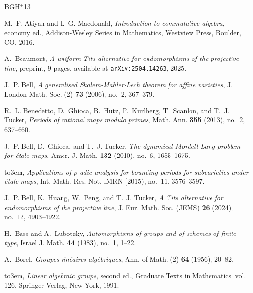 \documentclass{amsart}
\theoremstyle{definition}
\begin{document}
  \newcommand{\etalchar}[1]{$^{#1}$}
\providecommand{\bysame}{\leavevmode\hbox to3em{\hrulefill}\thinspace}
\providecommand{\MR}{\relax\ifhmode\unskip\space\fi MR }
\providecommand{\MRhref}[2]{%
  \href{http://www.ams.org/mathscinet-getitem?mr=#1}{#2}
}
\providecommand{\href}[2]{#2}
\begin{thebibliography}{BGH{\etalchar{+}}13}

M.~F. Atiyah and I.~G. Macdonald, \emph{Introduction to commutative algebra},
  economy ed., Addison-Wesley Series in Mathematics, Westview Press, Boulder,
  CO, 2016.

A.~Beaumont, \emph{A uniform {T}its alternative for endomorphisms of the
  projective line}, preprint, 9 pages, available at {\tt arXiv:2504.14263},
  2025.

J.~P. Bell, \emph{A generalised {S}kolem-{M}ahler-{L}ech theorem for affine
  varieties}, J. London Math. Soc. (2) \textbf{73} (2006), no.~2, 367--379.

\bibitem[BGH{\etalchar{+}}13]{Scanlon}
R.~L. Benedetto, D.~Ghioca, B.~Hutz, P.~Kurlberg, T.~Scanlon, and T.~J. Tucker,
  \emph{Periods of rational maps modulo primes}, Math. Ann. \textbf{355}
  (2013), no.~2, 637--660.

J.~P. Bell, D.~Ghioca, and T.~J. Tucker, \emph{The dynamical {M}ordell-{L}ang
  problem for \'{e}tale maps}, Amer. J. Math. \textbf{132} (2010), no.~6,
  1655--1675.

\bysame, \emph{Applications of {$p$}-adic analysis for bounding periods for
  subvarieties under \'{e}tale maps}, Int. Math. Res. Not. IMRN (2015), no.~11,
  3576--3597.

J.~P. Bell, K.~Huang, W.~Peng, and T.~J. Tucker, \emph{A {T}its alternative for
  endomorphisms of the projective line}, J. Eur. Math. Soc. (JEMS) \textbf{26}
  (2024), no.~12, 4903--4922.

H.~Bass and A.~Lubotzky, \emph{Automorphisms of groups and of schemes of finite
  type}, Israel J. Math. \textbf{44} (1983), no.~1, 1--22.

A.~Borel, \emph{Groupes lin\'eaires alg\'ebriques}, Ann. of Math. (2)
  \textbf{64} (1956), 20--82.

\bysame, \emph{Linear algebraic groups}, second ed., Graduate Texts in
  Mathematics, vol. 126, Springer-Verlag, New York, 1991.


\end{thebibliography}
\end{document}
